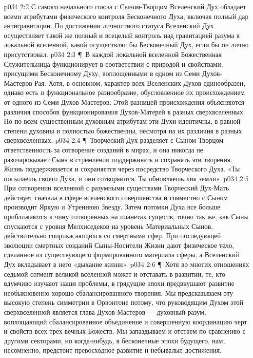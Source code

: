 \vs p034 2:2 С самого начального союза с Сыном\hyp{}Творцом Вселенский Дух обладает всеми атрибутами физического контроля Бесконечного Духа, включая полный дар антигравитации. По достижении личностного статуса Вселенский Дух осуществляет такой же полный и всецелый контроль над гравитацией разума в локальной вселенной, какой осуществлял бы Бесконечный Дух, если бы он лично присутствовал.
\vs p034 2:3 \P\ В каждой локальной вселенной Божественная Служительница функционирует в соответствии с природой и свойствами, присущими Бесконечному Духу, воплощенными в одном из Семи Духов\hyp{}Мастеров Рая. Хотя, в основном, характер всех Вселенских Духов единообразен, однако есть и функциональное разнообразие, обусловленное их происхождением от одного из Семи Духов\hyp{}Мастеров. Этой разницей происхождения объясняются различия способов функционирования Духов\hyp{}Матерей в разных сверхвселенных. Но по всем существенным духовным атрибутам эти Духи идентичны, в равной степени духовны и полностью божественны, несмотря на их различия в разных сверхвселенных.
\vs p034 2:4 \P\ Творческий Дух разделяет с Сыном\hyp{}Творцом ответственность за сотворение созданий в мирах, и она никогда не разочаровывает Сына в стремлении поддерживать и сохранять эти творения. Жизнь поддерживается и сохраняется через посредство Творческого Духа. «Ты посылаешь своего Духа, и они сотворяются. Ты обновляешь лик земли».
\vs p034 2:5 При сотворении вселенной с разумными существами Творческий Дух\hyp{}Мать действует сначала в сфере вселенского совершенства и совместно с Сыном производит Яркую и Утреннюю Звезду. Затем потомки Духа все больше приближаются к чину сотворенных на планетах существ, точно так же, как Сыны спускаются с уровня Мелхиседеков на уровень Материальных Сынов, действительно соприкасающихся со смертными сфер. При последующей эволюции смертных созданий Сыны\hyp{}Носители Жизни дают физическое тело, сделанное из существующего формированного материала сферы, а Вселенский Дух вкладывает в него «дыхание жизни».
\vs p034 2:6 \P\ Хотя во многих отношениях седьмой сегмент великой вселенной может и отставать в развитии, те, кто вдумчиво изучают наши проблемы, в грядущие эпохи предвкушают развитие необыкновенно хорошо сбалансированного творения. Мы предсказываем эту высокую степень симметрии в Орвонтоне потому, что руководящим Духом этой сверхвселенной является глава Духов\hyp{}Мастеров --- духовный разум, воплощающий сбалансированное объединение и совершенную координацию черт и свойств всех трех вечных Божеств. Мы запаздываем и отстаем по сравнению с другими секторами, но когда\hyp{}нибудь, в бесконечные эпохи будущего, нам, несомненно, предстоит превосходное развитие и небывалые достижения.
